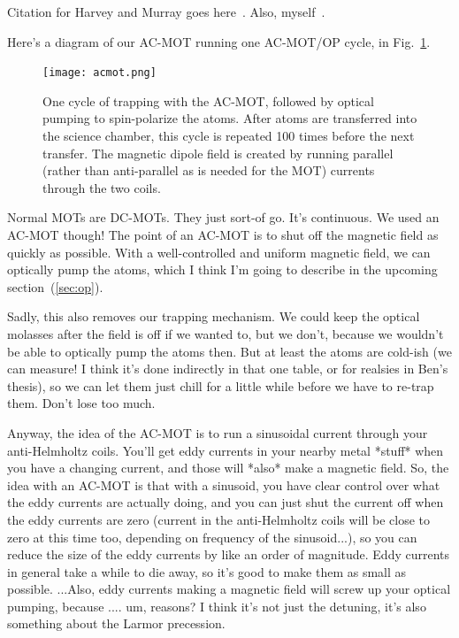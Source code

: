 Citation for Harvey and Murray goes here~\cite{harveymurray}.  Also, myself~\cite{thesis}.


Here's a diagram of our AC-MOT running one AC-MOT/OP cycle, in Fig.~\ref{fig:acmot}.

\begin{figure}[ht]
	\centering
		\texttt{[image: acmot.png]}
		\caption{One cycle of trapping with the AC-MOT, followed by optical pumping to spin-polarize the atoms.  After atoms are transferred into the science chamber, this cycle is repeated 100 times before the next transfer.  The magnetic dipole field is created by running parallel (rather than anti-parallel as is needed for the MOT) currents through the two coils.}
		\label{fig:acmot}
\end{figure}


Normal MOTs are DC-MOTs.  They just sort-of go.  It's continuous.  We used an AC-MOT though!  The point of an AC-MOT is to shut off the magnetic field as quickly as possible.  With a well-controlled and uniform magnetic field, we can optically pump the atoms, which I think I'm going to describe in the upcoming section~(\ref{sec:op}).

Sadly, this also removes our trapping mechanism.  We could keep the optical molasses after the field is off if we wanted to, but we don't, because we wouldn't be able to optically pump the atoms then.  But at least the atoms are cold-ish (we can measure!  I think it's done indirectly in that one table, or for realsies in Ben's thesis), so we can let them just chill for a little while before we have to re-trap them.  Don't lose too much.  

Anyway, the idea of the AC-MOT is to run a sinusoidal current through your anti-Helmholtz coils.  You'll get eddy currents in your nearby metal *stuff* when you have a changing current, and those will *also* make a magnetic field. So, the idea with an AC-MOT is that with a sinusoid, you have clear control over what the eddy currents are actually doing, and you can just shut the current off when the eddy currents are zero (current in the anti-Helmholtz coils will be close to zero at this time too, depending on frequency of the sinusoid...), so you can reduce the size of the eddy currents by like an order of magnitude.  Eddy currents in general take a while to die away, so it's good to make them as small as possible.  ...Also, eddy currents making a magnetic field will screw up your optical pumping, because .... um, reasons?  I think it's not just the detuning, it's also something about the Larmor precession.  

